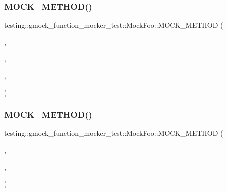 \mbox{\label{classtesting_1_1gmock__function__mocker__test_1_1_mock_foo_ab6783427c5fb99f8a9c25fba9210c748}} 
\subsubsection{\texorpdfstring{MOCK\_METHOD()}{MOCK\_METHOD()}\hspace{0.1cm}{\footnotesize\ttfamily [10/38]}}
{\footnotesize\ttfamily testing\+::gmock\+\_\+function\+\_\+mocker\+\_\+test\+::\+Mock\+Foo\+::\+M\+O\+C\+K\+\_\+\+M\+E\+T\+H\+OD (\begin{DoxyParamCaption}\item[{int}]{,  }\item[{\mbox{\hyperlink{classtesting_1_1gmock__function__mocker__test_1_1_foo_interface_a2a415a61b9a9c7a69bba9a4b5ef2a63e}{Decimal}}}]{,  }\item[{(bool, char, short, int, long, float, double, unsigned, char $\ast$, const std\+::string \&str)}]{,  }\item[{(override)}]{ }\end{DoxyParamCaption})}

\mbox{\label{classtesting_1_1gmock__function__mocker__test_1_1_mock_foo_a50aeadd7e413ca2a8ba4507b21d4b345}} 
\subsubsection{\texorpdfstring{MOCK\_METHOD()}{MOCK\_METHOD()}\hspace{0.1cm}{\footnotesize\ttfamily [11/38]}}
{\footnotesize\ttfamily testing\+::gmock\+\_\+function\+\_\+mocker\+\_\+test\+::\+Mock\+Foo\+::\+M\+O\+C\+K\+\_\+\+M\+E\+T\+H\+OD (\begin{DoxyParamCaption}\item[{bool}]{,  }\item[{\mbox{\hyperlink{classtesting_1_1gmock__function__mocker__test_1_1_foo_interface_aaf21cef138ffa4a8f2372c7fbed95b18}{Takes\+Non\+Const\+Reference}}}]{,  }\item[{(int \&)}]{ }\end{DoxyParamCaption})}

